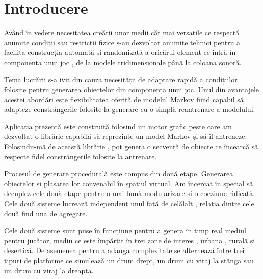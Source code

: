 \chapter*{Introducere} 

Având în vedere necesitatea creării unor medii căt mai versatile ce respectă anumite condiții sau restricții fizice s-au dezvoltat anumite tehnici pentru a facilita construcția automată și randomizată a oricărui element ce intră în componența unui joc , de la modele tridimensionale până la coloana sonoră.\par

Tema lucrării s-a ivit din cauza necesității de adaptare rapidă a condițiilor folosite pentru generarea obiectelor din componența unui joc. Unul din avantajele acestei abordări este flexibilitatea oferită de modelul Markov fiind capabil să adapteze constrăngerile folosite la generare cu o simplă reantrenare a modelului.\par

Aplicația prezentă este construită folosind un motor grafic peste care am dezvoltat o librărie capabilă să reprezinte un model Markov și să îl antreneze. Folosindu-mă de această librărie , pot genera o secvență de obiecte ce încearcă să respecte fidel constrângerile folosite la antrenare.\par

Procesul de generare procedurală este compus din două etape. Generarea obiectelor și plasarea lor convenabil în șpațiul virtual. Am încercat în special să decuplez cele două etape pentru o mai bună modularizare și o coeziune ridicată. Cele două sisteme lucrează independent unul față de celălalt , relația dintre cele două find una de agregare.

Cele două sisteme sunt puse în funcțiune pentru a genera în timp real mediul pentru jucător, mediu ce este împărțit în trei zone de interes , urbana , rurală și deșertică. De asemenea pentru a adauga complexitate se alternează între trei tipuri de platforme ce simulează un drum drept, un drum cu viraj la stănga sau un drum cu viraj la dreapta.\par